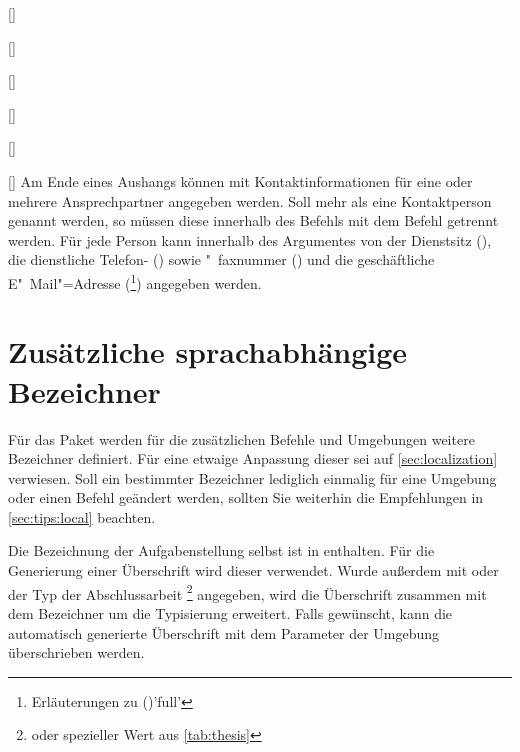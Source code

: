 \begin{Entity*}{}
\begin{Declaration}[v2.02]{[]}
\begin{Declaration'}{%
  []%
}
\begin{Declaration'}{[]}
\begin{Declaration}[v2.02]{[]}
\begin{Declaration}[v2.05]{[]}
\begin{Declaration}{[]}
\printdeclarationlist%
%
Am Ende eines Aushangs können mit  Kontaktinformationen 
für eine oder mehrere Ansprechpartner angegeben werden. Soll mehr als eine 
Kontaktperson genannt werden, so müssen diese innerhalb des Befehls
 mit dem Befehl  getrennt werden. Für jede 
Person kann innerhalb des Argumentes von  der Dienstsitz 
(), die dienstliche Telefon- () sowie "~faxnummer
() und die geschäftliche E"~Mail"=Adresse 
(\footnote{Erläuterungen zu ()'full'}) 
angegeben werden.
\end{Declaration}
\end{Declaration}
\end{Declaration}
\end{Declaration'}
\end{Declaration'}
\end{Declaration}



\section{%
  Zusätzliche sprachabhängige Bezeichner%
}
Für das Paket  werden für die zusätzlichen Befehle 
und Umgebungen weitere Bezeichner definiert. Für eine etwaige Anpassung dieser 
sei auf \autoref{sec:localization} verwiesen. Soll ein bestimmter Bezeichner 
lediglich einmalig für eine Umgebung oder einen Befehl geändert werden, sollten 
Sie weiterhin die Empfehlungen in \autoref{sec:tips:local} beachten.

\begin{Declaration}{}
\begin{Declaration}{}
\printdeclarationlist%
%
Die Bezeichnung der Aufgabenstellung selbst ist in  enthalten. 
Für die Generierung einer Überschrift wird dieser verwendet. Wurde außerdem mit 
 oder  der Typ der Abschlussarbeit%
\footnote{%
   oder spezieller Wert aus \autoref{tab:thesis}%
}
angegeben, wird die Überschrift zusammen mit dem Bezeichner 
um die Typisierung erweitert. Falls gewünscht, kann die automatisch generierte 
Überschrift mit dem Parameter  der Umgebung 
 überschrieben werden.
%
\end{Declaration}
\end{Declaration}


\end{Entity*}
